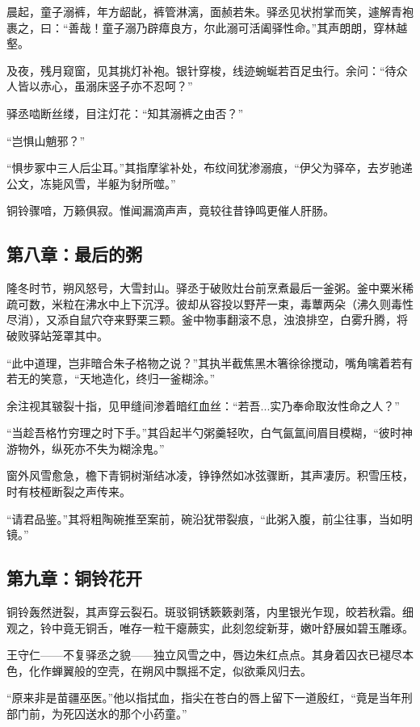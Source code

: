 \documentclass{article}
\begin{document}
	晨起，童子溺裤，年方龆龀，裤管淋漓，面赪若朱。驿丞见状拊掌而笑，遽解青袍裹之，曰：“善哉！童子溺乃辟瘴良方，尔此溺可活阖驿性命。”其声朗朗，穿林越壑。
	
	及夜，残月窥窗，见其挑灯补袍。银针穿梭，线迹蜿蜒若百足虫行。余问：“待众人皆以赤心，虽溺床竖子亦不忍呵？”
	
	驿丞啮断丝缕，目注灯花：“知其溺裤之由否？”
	
	“岂惧山魈邪？”
	
	“惧步冢中三人后尘耳。”其指摩挲补处，布纹间犹渗溺痕，“伊父为驿卒，去岁驰递公文，冻毙风雪，半躯为豺所噬。”
	
	铜铃骤喑，万籁俱寂。惟闻漏滴声声，竟较往昔铮鸣更催人肝肠。
	
	\subsection{第八章：最后的粥}
	
	隆冬时节，朔风怒号，大雪封山。驿丞于破败灶台前烹煮最后一釜粥。釜中粟米稀疏可数，米粒在沸水中上下沉浮。彼却从容投以野芹一束，毒蕈两朵（沸久则毒性尽消），又添自鼠穴夺来野栗三颗。釜中物事翻滚不息，浊浪排空，白雾升腾，将破败驿站笼罩其中。
	
	“此中道理，岂非暗合朱子格物之说？”其执半截焦黑木箸徐徐搅动，嘴角噙着若有若无的笑意，“天地造化，终归一釜糊涂。”
	
	余注视其皲裂十指，见甲缝间渗着暗红血丝：“若吾...实乃奉命取汝性命之人？”
	
	“当趁吾格竹穷理之时下手。”其舀起半勺粥羹轻吹，白气氤氲间眉目模糊，“彼时神游物外，纵死亦不失为糊涂鬼。”
	
	窗外风雪愈急，檐下青铜树渐结冰凌，铮铮然如冰弦骤断，其声凄厉。积雪压枝，时有枝桠断裂之声传来。
	
	“请君品鉴。”其将粗陶碗推至案前，碗沿犹带裂痕，“此粥入腹，前尘往事，当如明镜。”
	
	\subsection{第九章：铜铃花开}
	
	铜铃轰然迸裂，其声穿云裂石。斑驳铜锈簌簌剥落，内里银光乍现，皎若秋霜。细观之，铃中竟无铜舌，唯存一粒干瘪蕨实，此刻忽绽新芽，嫩叶舒展如碧玉雕琢。
	
	王守仁——不复驿丞之貌——独立风雪之中，唇边朱红点点。其身着囚衣已褪尽本色，化作蝉翼般的空壳，在朔风中飘摇不定，似欲乘风归去。
	
	“原来非是苗疆巫医。”他以指拭血，指尖在苍白的唇上留下一道殷红，“竟是当年刑部门前，为死囚送水的那个小药童。”
	
\end{document}

